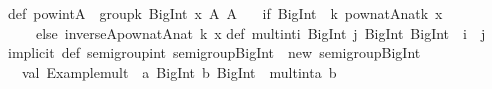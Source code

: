\begin{isabellebody}
\begin{isamarkuptext}
{}\isanewline
\isanewline
def\ pow{}int{}A\ {}\ group{}{}k{}\ BigInt{}\ x{}\ A{}{}\ A\ {}\isanewline
\ \ {}if\ {}BigInt{}{}{}\ {}{}\ k{}\ pow{}nat{}A{}{}nat{}k{}{}\ x{}\isanewline
\ \ \ \ else\ inverse{}A{}{}pow{}nat{}A{}{}nat{}{}{}\ k{}{}{}\ x{}{}{}\isanewline
\isanewline
def\ mult{}int{}i{}\ BigInt{}\ j{}\ BigInt{}{}\ BigInt\ {}\ i\ {}\ j\isanewline
\isanewline
implicit\ def\ semigroup{}int{}\ semigroup{}BigInt{}\ {}\ new\ semigroup{}BigInt{}\ {}\isanewline
\ \ val\ {}Example{}mult{}\ {}\ {}a{}\ BigInt{}\ b{}\ BigInt{}\ {}{}\ mult{}int{}a{}\ b{}\isanewline

\end{isamarkuptext}
\end{isabellebody}
